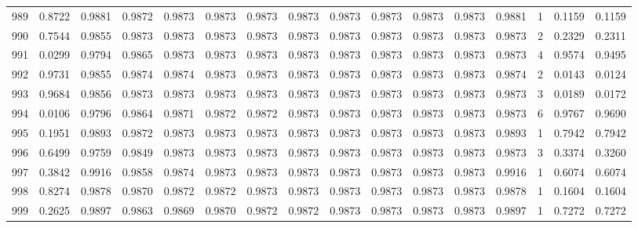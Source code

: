 \begin{tabular}{lrrrrrrrrrrrrrrr}
989 &      0.8722 &  0.9881 &  0.9872 &  0.9873 &  0.9873 &  0.9873 &  0.9873 &  0.9873 &  0.9873 &  0.9873 &   0.9873 &     0.9881 &      1 &                    0.1159 &                     0.1159 \\
990 &      0.7544 &  0.9855 &  0.9873 &  0.9873 &  0.9873 &  0.9873 &  0.9873 &  0.9873 &  0.9873 &  0.9873 &   0.9873 &     0.9873 &      2 &                    0.2329 &                     0.2311 \\
991 &      0.0299 &  0.9794 &  0.9865 &  0.9873 &  0.9873 &  0.9873 &  0.9873 &  0.9873 &  0.9873 &  0.9873 &   0.9873 &     0.9873 &      4 &                    0.9574 &                     0.9495 \\
992 &      0.9731 &  0.9855 &  0.9874 &  0.9874 &  0.9873 &  0.9873 &  0.9873 &  0.9873 &  0.9873 &  0.9873 &   0.9873 &     0.9874 &      2 &                    0.0143 &                     0.0124 \\
993 &      0.9684 &  0.9856 &  0.9873 &  0.9873 &  0.9873 &  0.9873 &  0.9873 &  0.9873 &  0.9873 &  0.9873 &   0.9873 &     0.9873 &      3 &                    0.0189 &                     0.0172 \\
994 &      0.0106 &  0.9796 &  0.9864 &  0.9871 &  0.9872 &  0.9872 &  0.9873 &  0.9873 &  0.9873 &  0.9873 &   0.9873 &     0.9873 &      6 &                    0.9767 &                     0.9690 \\
995 &      0.1951 &  0.9893 &  0.9872 &  0.9873 &  0.9873 &  0.9873 &  0.9873 &  0.9873 &  0.9873 &  0.9873 &   0.9873 &     0.9893 &      1 &                    0.7942 &                     0.7942 \\
996 &      0.6499 &  0.9759 &  0.9849 &  0.9873 &  0.9873 &  0.9873 &  0.9873 &  0.9873 &  0.9873 &  0.9873 &   0.9873 &     0.9873 &      3 &                    0.3374 &                     0.3260 \\
997 &      0.3842 &  0.9916 &  0.9858 &  0.9874 &  0.9873 &  0.9873 &  0.9873 &  0.9873 &  0.9873 &  0.9873 &   0.9873 &     0.9916 &      1 &                    0.6074 &                     0.6074 \\
998 &      0.8274 &  0.9878 &  0.9870 &  0.9872 &  0.9872 &  0.9873 &  0.9873 &  0.9873 &  0.9873 &  0.9873 &   0.9873 &     0.9878 &      1 &                    0.1604 &                     0.1604 \\
999 &      0.2625 &  0.9897 &  0.9863 &  0.9869 &  0.9870 &  0.9872 &  0.9872 &  0.9873 &  0.9873 &  0.9873 &   0.9873 &     0.9897 &      1 &                    0.7272 &                     0.7272 \\
\bottomrule
\end{tabular}
